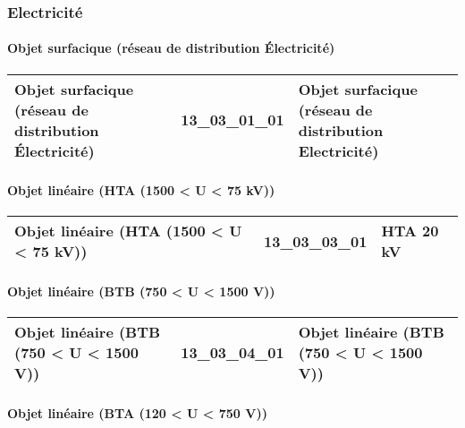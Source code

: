 \documentclass[12pt,titlepage,oneside]{book}
\begin{document}
\subsubsection{\large Electricité}
\paragraph{Objet surfacique (réseau de distribution Électricité)}
\noindent
\vspace{\baselineskip}

\renewcommand{\arraystretch}{1.2}
\begin{supertabular}{|p{10cm}|c|p{15cm}|}
 Objet surfacique (réseau de distribution Électricité) & 13\_03\_01\_01 & Objet surfacique (réseau de distribution Electricité)\\
\hline
\end{supertabular}


\paragraph{Objet linéaire (HTA (1500 < U < 75 kV))}
\noindent
\vspace{\baselineskip}

\renewcommand{\arraystretch}{1.2}
\begin{supertabular}{|p{10cm}|c|p{15cm}|}
 Objet linéaire (HTA (1500 < U < 75 kV)) & 13\_03\_03\_01 & HTA 20 kV\\
\hline
\end{supertabular}


\paragraph{Objet linéaire (BTB (750 < U < 1500 V))}
\noindent
\vspace{\baselineskip}

\renewcommand{\arraystretch}{1.2}
\begin{supertabular}{|p{10cm}|c|p{15cm}|}
 Objet linéaire (BTB (750 < U < 1500 V)) & 13\_03\_04\_01 & Objet linéaire (BTB (750 < U < 1500 V))\\
\hline
\end{supertabular}


\paragraph{Objet linéaire (BTA (120 < U < 750 V))}
\noindent
\vspace{\baselineskip}
\end{document}
